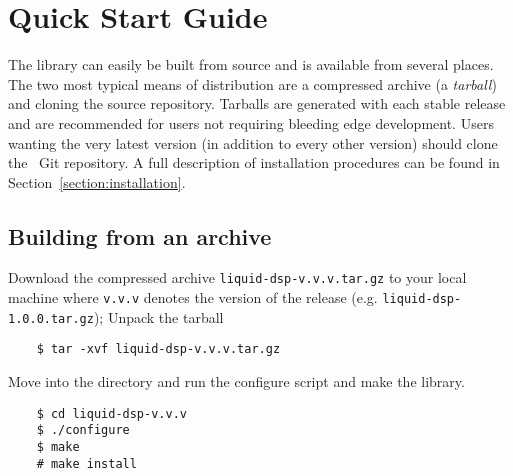 %
%

\section{Quick Start Guide}
\label{section:quickstart}
The library can easily be built from source and is available from
several places.
The two most typical means of distribution are a compressed archive
(a {\em tarball}) and cloning the source repository.
Tarballs are generated with each stable release and are recommended for
users not requiring bleeding edge development.
Users wanting the very latest version (in addition to every other
version) should clone the \liquid\ Git repository.
A full description of installation procedures can be found in
Section~\ref{section:installation}.

\subsection{Building from an archive}
\label{section:quickstart:build_from_tarball}
Download the compressed archive {\tt liquid-dsp-v.v.v.tar.gz} to your
local machine where {\tt v.v.v} denotes the version of the release
(e.g. {\tt liquid-dsp-1.0.0.tar.gz});
%
%
%
%
Unpack the tarball
%
\begin{verbatim}
    $ tar -xvf liquid-dsp-v.v.v.tar.gz
\end{verbatim}
%
Move into the directory and run the configure script and make the
library.
%
\begin{verbatim}
    $ cd liquid-dsp-v.v.v
    $ ./configure
    $ make
    # make install
\end{verbatim}

